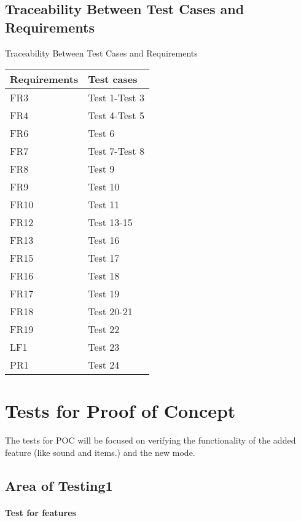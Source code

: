\documentclass[12pt, titlepage]{article}
\begin{document}
\subsection{Traceability Between Test Cases and Requirements}
Traceability Between Test Cases and Requirements
\begin{table}[H]
	\centering
	\begin{tabular}[r]{|l|l|}
		\hline
		\textbf{Requirements}& \textbf{Test cases} \\ \hline
		FR3 & Test 1-Test 3 \\ \hline
		FR4 & Test 4-Test 5 \\ \hline
		FR6 & Test 6 \\ \hline
		FR7 & Test 7-Test 8  \\ \hline
		FR8 & Test 9 \\ \hline
		FR9 & Test 10 \\ \hline
		FR10 & Test 11 \\ \hline
		FR12 & Test 13-15 \\ \hline
		FR13 & Test 16 \\	\hline
		FR15 & Test 17 \\ \hline
		FR16 & Test 18 \\ \hline
		FR17 & Test 19 \\ \hline
		FR18 & Test 20-21 \\ \hline
		FR19 & Test 22 \\ \hline
		LF1 & Test 23 \\ \hline
		PR1 & Test 24 \\ \hline
	\end{tabular}
\end{table}



\section{Tests for Proof of Concept}
    The tests for POC will be focused on verifying the functionality of the added feature (like sound and items.) and the new mode.
\subsection{Area of Testing1}
    
\paragraph{Test for features}
\end{document}
